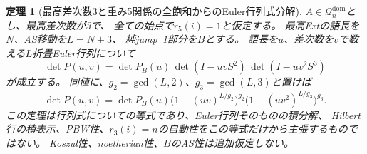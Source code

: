 \documentclass[11pt,a4paper]{ltjsarticle}
\newtheorem{theorem}{定理}[section]
\theoremstyle{definition}
\begin{document}
\begin{theorem}[最高差次数3と重み5関係の全飽和からのEuler行列式分解]
\label{genidx:thm:d3-full-r5-euler-factorization}
$A\in\mathcal Q_n^{\mathrm{dom}}$とし、最高差次数が3で、
全ての始点で$r_5(i)=1$と仮定する。
最高Extの語長を$N$、AS移動を$L=N+3$、
純jump~1部分を$B$とする。
語長を$u$、差次数を$v$で数える$L$折畳Euler行列について
\[
 \boxed{\quad
 \det P(u,v)=\det P_B(u)\,
             \det(I-uvS^2)\,
             \det(I-uv^2S^3)
 \quad}
\]
が成立する。
同値に、$g_2=\gcd(L,2)$、$g_3=\gcd(L,3)$と置けば
\[
 \det P(u,v)=\det P_B(u)
     \bigl(1-(uv)^{L/g_2}\bigr)^{g_2}
     \bigl(1-(uv^2)^{L/g_3}\bigr)^{g_3}.
\]
この定理は行列式についての等式であり、Euler行列そのものの積分解、
Hilbert行の積表示、PBW性、$r_3(i)=n$の自動性をこの等式だけから主張するものではない。
Koszul性、noetherian性、$B$のAS性は追加仮定しない。
\end{theorem}
\end{document}
